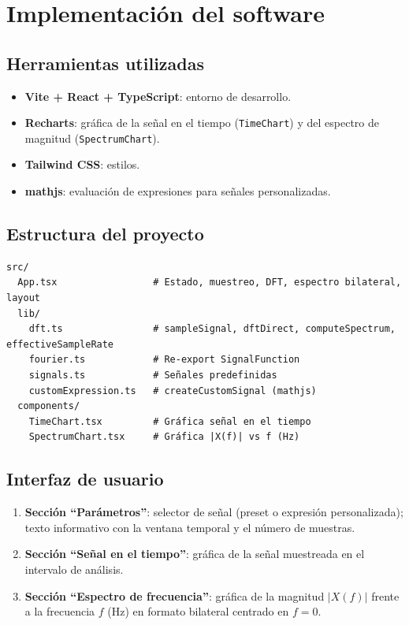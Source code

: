 \documentclass[12pt,a4paper]{article}
\begin{document}
\section{Implementación del software}

\subsection{Herramientas utilizadas}

\begin{itemize}
  \item \textbf{Vite + React + TypeScript}: entorno de desarrollo.
  \item \textbf{Recharts}: gráfica de la señal en el tiempo (\texttt{TimeChart}) y del espectro de magnitud (\texttt{SpectrumChart}).
  \item \textbf{Tailwind CSS}: estilos.
  \item \textbf{mathjs}: evaluación de expresiones para señales personalizadas.
\end{itemize}

\subsection{Estructura del proyecto}

\begin{verbatim}
src/
  App.tsx                 # Estado, muestreo, DFT, espectro bilateral, layout
  lib/
    dft.ts                # sampleSignal, dftDirect, computeSpectrum, effectiveSampleRate
    fourier.ts            # Re-export SignalFunction
    signals.ts            # Señales predefinidas
    customExpression.ts   # createCustomSignal (mathjs)
  components/
    TimeChart.tsx         # Gráfica señal en el tiempo
    SpectrumChart.tsx     # Gráfica |X(f)| vs f (Hz)
\end{verbatim}

\subsection{Interfaz de usuario}

\begin{enumerate}
  \item \textbf{Sección ``Parámetros''}: selector de señal (preset o expresión personalizada); texto informativo con la ventana temporal y el número de muestras.
  \item \textbf{Sección ``Señal en el tiempo''}: gráfica de la señal muestreada en el intervalo de análisis.
  \item \textbf{Sección ``Espectro de frecuencia''}: gráfica de la magnitud \(|X(f)|\) frente a la frecuencia \(f\) (Hz) en formato bilateral centrado en \(f=0\).
\end{enumerate}
\end{document}
